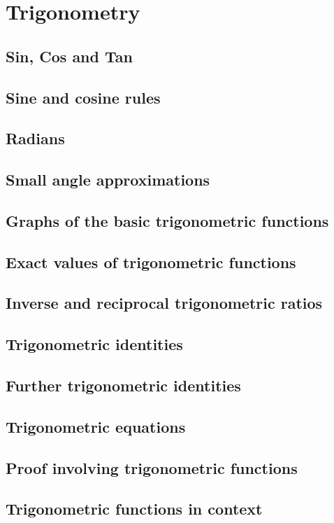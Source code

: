 
\chapter{Trigonometry}

\section{Sin, Cos and Tan}
\section{Sine and cosine rules}
\section{Radians}

\section{Small angle approximations}
\section{Graphs of the basic trigonometric functions}
\section{Exact values of trigonometric functions}
\section{Inverse and reciprocal trigonometric ratios}
\section{Trigonometric identities}
\section{Further trigonometric identities}
\section{Trigonometric equations}
\section{Proof involving trigonometric functions}
\section{Trigonometric functions in context}
